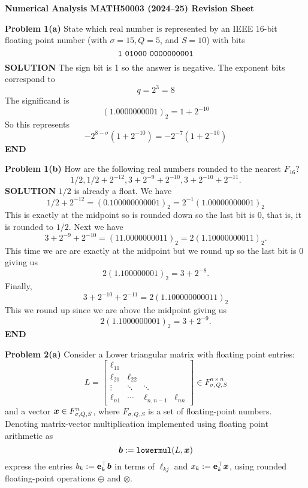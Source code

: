 \documentclass[12pt,a4paper]{article}
\def\endash{–}
\def\x{ {\vc x} }
\def\b{ {\vc b} }
\begin{document}
\textbf{Numerical Analysis MATH50003 (2024\ensuremath{\endash}25) Revision Sheet}

\textbf{Problem 1(a)} State which real number is represented by an IEEE 16-bit floating point number (with $\ensuremath{\sigma} = 15, Q = 5$, and $S = 10$) with bits
\[
{\tt 1\ 01000\ 0000000001}
\]
\textbf{SOLUTION} The sign bit is 1 so the answer is negative. The exponent bits correspond to
\[
q = 2^3 = 8
\]
The significand is
\[
(1.0000000001)_2 = 1 + 2^{-10}
\]
So this represents
\[
-2^{8-\ensuremath{\sigma}} (1 + 2^{-10}) = - 2^{-7} (1 + 2^{-10})
\]
\textbf{END}

\textbf{Problem 1(b)}  How are the following real numbers rounded to the nearest $F_{16}$?
\[
1/2, 1/2 + 2^{-12}, 3 + 2^{-9} + 2^{-10}, 3 + 2^{-10} + 2^{-11}.
\]
\textbf{SOLUTION} $1/2$ is already a float. We have
\[
1/2 + 2^{-12} = (0.100000000001)_2 = 2^{-1} (1.00000000001)_2
\]
This is exactly at the midpoint so is rounded down so the last bit is 0, that is, it is rounded to $1/2$.  Next we have
\[
3 + 2^{-9}  + 2^{-10} = (11.0000000011)_2 = 2(1.10000000011)_2.
\]
This time we are are exactly at the midpoint but we round up so the last bit is 0 giving us
\[
2(1.100000001)_2 = 3 + 2^{-8}.
\]
Finally,
\[
3 + 2^{-10} + 2^{-11} = 2(1.100000000011)_2
\]
This we round up since we are above the midpoint giving us
\[
2(1.1000000001)_2 = 3 + 2^{-9}.
\]
\textbf{END}

\textbf{Problem 2(a)} Consider a Lower triangular matrix with floating point entries:
\[
L = \begin{bmatrix}
\ensuremath{\ell}_{11} \\
 \ensuremath{\ell}_{21} & \ensuremath{\ell}_{22} \\
 \ensuremath{\vdots} & \ensuremath{\ddots} & \ensuremath{\ddots} \\
 \ensuremath{\ell}_{n1} & \ensuremath{\cdots} & \ensuremath{\ell}_{n,n-1} & \ensuremath{\ell}_{nn}
 \end{bmatrix} \ensuremath{\in} F_{\ensuremath{\sigma},Q,S}^{n \ensuremath{\times} n}
\]
and a vector $\ensuremath{\bm{\x}} \in F_{\ensuremath{\sigma},Q,S}^{n}$, where $F_{\ensuremath{\sigma},Q,S}$ is a set of floating-point numbers. Denoting matrix-vector multiplication implemented using floating point arithmetic as
\[
\ensuremath{\bm{\b}} := {\tt lowermul}(L,\ensuremath{\bm{\x}})
\]
express the entries $b_k := {\bf e}_k^\ensuremath{\top} \ensuremath{\bm{\b}}$  in terms of $\ensuremath{\ell}_{kj}$ and $x_k := {\bf e}_k^\ensuremath{\top} \ensuremath{\bm{\x}}$,  using rounded floating-point operations $\ensuremath{\oplus}$ and $\ensuremath{\otimes}$.
\end{document}
